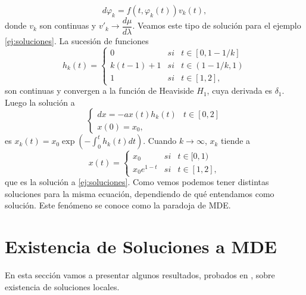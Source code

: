 \begin{equation}
	d\varphi_k=f(t,\varphi_k(t))v_k(t),
\end{equation}
donde $v_k$ son continuas y  $v'_k\to \dfrac{d\mu}{d\lambda}$.
Veamos este tipo de solución para  el ejemplo \eqref{ej:soluciones}. La sucesión de funciones
\begin{equation*}
h_k(t)=\left\{\begin{array}{ccc}
        0 & si & t\in[0,1-1/k]\\
        k(t-1)+1 & si & t\in(1-1/k,1)  \\
        1 &si & t\in[1,2],
    \end{array}\right.
\end{equation*}
son continuas y convergen a la función de Heaviside $H_1$, cuya derivada es $\delta_1$. Luego la solución a
\begin{equation}
\left\{\begin{array}{lc}
        dx=-ax(t)h_k(t) & t\in[0,2]  \\
          x(0)=x_0, &
    \end{array}\right.
\end{equation}
es $x_k(t)=x_0\exp{\left(-\int_0^th_k(t) dt\right)}$. Cuando $k\to \infty$, $x_k$ tiende a
\begin{equation*}
x(t)=\left\{\begin{array}{ccc}
        x_0 & si & t\in[0,1)\\
        
        x_0e^{1-t} &si & t\in[1,2],
    \end{array}\right.
\end{equation*}
que es la solución a \eqref{ej:soluciones}. 
Como vemos podemos tener distintas soluciones para la misma ecuación, dependiendo de qué entendamos como solución. Este fenómeno se conoce como la paradoja de MDE.


 
 
 
 
 
 
 
 
 
 
 
 
 
 
 
 \section{Existencia de Soluciones a MDE}
  En esta sección vamos a presentar algunos resultados, probados en \cite{P.Mazzone}, sobre existencia de soluciones locales. 

